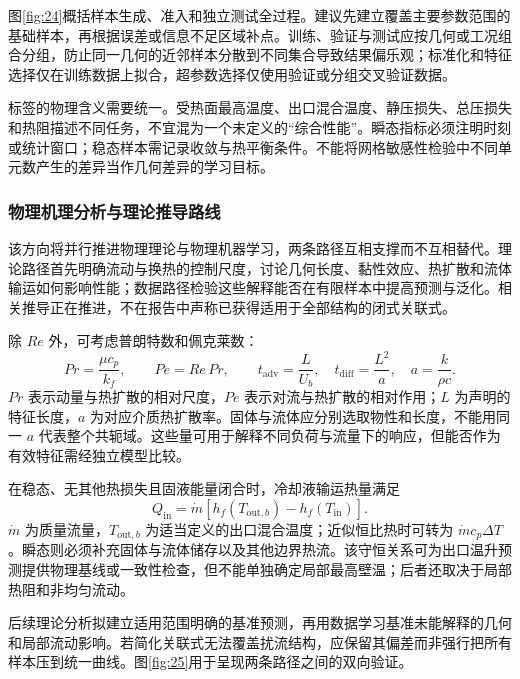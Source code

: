 \documentclass[UTF8]{midterm}
\begin{document}
图\ref{fig:24}概括样本生成、准入和独立测试全过程。建议先建立覆盖主要参数范围的基础样本，再根据误差或信息不足区域补点。训练、验证与测试应按几何或工况组合分组，防止同一几何的近邻样本分散到不同集合导致结果偏乐观；标准化和特征选择仅在训练数据上拟合，超参数选择仅使用验证或分组交叉验证数据。

标签的物理含义需要统一。受热面最高温度、出口混合温度、静压损失、总压损失和热阻描述不同任务，不宜混为一个未定义的“综合性能”。瞬态指标必须注明时刻或统计窗口；稳态样本需记录收敛与热平衡条件。不能将网格敏感性检验中不同单元数产生的差异当作几何差异的学习目标。

\subsubsection{物理机理分析与理论推导路线}
该方向将并行推进物理理论与物理机器学习，两条路径互相支撑而不互相替代。理论路径首先明确流动与换热的控制尺度，讨论几何长度、黏性效应、热扩散和流体输运如何影响性能；数据路径检验这些解释能否在有限样本中提高预测与泛化。相关推导正在推进，不在报告中声称已获得适用于全部结构的闭式关联式。

除 $Re$ 外，可考虑普朗特数和佩克莱数：
\begin{equation}
Pr=\frac{\mu c_p}{k_f},\qquad Pe=Re\,Pr,\qquad
t_{\mathrm{adv}}=\frac{L}{U_b},\quad t_{\mathrm{diff}}=\frac{L^2}{a},\quad a=\frac{k}{\rho c}.\label{eq:scales}
\end{equation}
$Pr$ 表示动量与热扩散的相对尺度，$Pe$ 表示对流与热扩散的相对作用；$L$ 为声明的特征长度，$a$ 为对应介质热扩散率。固体与流体应分别选取物性和长度，不能用同一 $a$ 代表整个共轭域。这些量可用于解释不同负荷与流量下的响应，但能否作为有效特征需经独立模型比较。

在稳态、无其他热损失且固液能量闭合时，冷却液输运热量满足
\begin{equation}
Q_{\mathrm{in}}=\dot m\left[h_f(T_{\mathrm{out},b})-h_f(T_{\mathrm{in}})\right].\label{eq:bulkenergy}
\end{equation}
$\dot m$ 为质量流量，$T_{\mathrm{out},b}$ 为适当定义的出口混合温度；近似恒比热时可转为 $\dot m c_p\Delta T$。瞬态则必须补充固体与流体储存以及其他边界热流。该守恒关系可为出口温升预测提供物理基线或一致性检查，但不能单独确定局部最高壁温；后者还取决于局部热阻和非均匀流动。

后续理论分析拟建立适用范围明确的基准预测，再用数据学习基准未能解释的几何和局部流动影响。若简化关联式无法覆盖扰流结构，应保留其偏差而非强行把所有样本压到统一曲线。图\ref{fig:25}用于呈现两条路径之间的双向验证。
\end{document}
